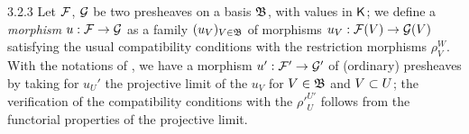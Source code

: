 \documentclass[../main.tex]{subfiles}
\begin{document}
\begin{env}{3.2.3}
Let $\mathcal{F}$, $\mathcal{G}$ be two presheaves on a basis $\mathfrak{B}$, with values in $\mathsf{K}$; we define a \emph{morphism}
$u:\mathcal{F}\to\mathcal{G}$ as a family $(u_V)_{V\in\mathfrak{B}}$ of morphisms $u_V:\mathcal{F}(V)\to\mathcal{G}(V)$ satisfying the usual
compatibility conditions with the restriction morphisms $\rho_V^W$. With the notations of ,
we have a morphism $u':\mathcal{F}'\to\mathcal{G}'$ of (ordinary) presheaves by taking for $u_U'$ the projective limit
of the $u_V$ for $V\in\mathfrak{B}$ and $V\subset U$; the verification of the compatibility conditions with
the ${\rho'}_U^{U'}$ follows from the functorial properties of the projective limit.
\end{env}
\end{document}
